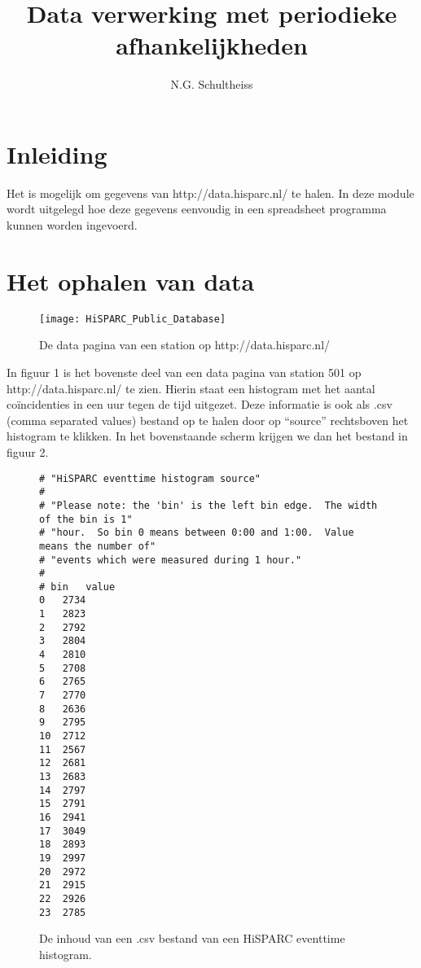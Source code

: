 



\title{Data verwerking met periodieke afhankelijkheden}
\author{N.G. Schultheiss}
\date{}

\maketitle
\thispagestyle{firststyle}

\section{Inleiding}

Het is mogelijk om gegevens van http://data.hisparc.nl/ te halen. In
deze module wordt uitgelegd hoe deze gegevens eenvoudig in een spreadsheet
programma kunnen worden ingevoerd.


\section{Het ophalen van data}

\begin{figure}[h]
\centering
\texttt{[image: HiSPARC\_Public\_Database]}

\caption{De data pagina van een station op http://data.hisparc.nl/}
\end{figure}


In figuur 1 is het bovenste deel van een data pagina van station 501 op
http://data.hisparc.nl/ te zien. Hierin staat een histogram met het
aantal coïncidenties in een uur tegen de tijd uitgezet. Deze informatie
is ook als .csv (comma separated values) bestand op te halen door op
``source'' rechtsboven het histogram te klikken. In het bovenstaande
scherm krijgen we dan het bestand in figuur 2.

\begin{figure}[h]
\centering
\begin{verbatim}
# "HiSPARC eventtime histogram source"
#
# "Please note: the 'bin' is the left bin edge.  The width of the bin is 1"
# "hour.  So bin 0 means between 0:00 and 1:00.  Value means the number of"
# "events which were measured during 1 hour."
#
# bin	value
0	2734
1	2823
2	2792
3	2804
4	2810
5	2708
6	2765
7	2770
8	2636
9	2795
10	2712
11	2567
12	2681
13	2683
14	2797
15	2791
16	2941
17	3049
18	2893
19	2997
20	2972
21	2915
22	2926
23	2785
\end{verbatim}
\caption{De inhoud van een .csv bestand van een HiSPARC eventtime histogram.}
\label{fig:eventtime-source}
\end{figure}


